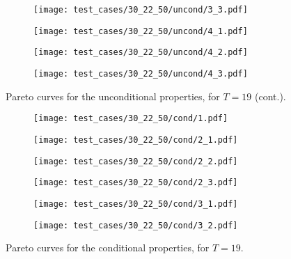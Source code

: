 \begin{figure}[H] \ContinuedFloat
\centering
\begin{subfigure}{0.49\textwidth}
  \centering
  \texttt{[image: test\_cases/30\_22\_50/uncond/3\_3.pdf]}
\end{subfigure}
\begin{subfigure}{0.49\textwidth}
  \centering
  \texttt{[image: test\_cases/30\_22\_50/uncond/4\_1.pdf]}
\end{subfigure} 
\begin{subfigure}{0.49\textwidth}
  \centering
  \texttt{[image: test\_cases/30\_22\_50/uncond/4\_2.pdf]}
\end{subfigure}
\begin{subfigure}{0.49\textwidth}
  \centering
  \texttt{[image: test\_cases/30\_22\_50/uncond/4\_3.pdf]}
\end{subfigure}
\caption{Pareto curves for the unconditional properties, for $T = 19$ (cont.).}
\label{fig:test_case_2_uncond}
\end{figure}

\begin{figure}[H]
\centering
\begin{subfigure}{0.49\textwidth}
  \centering
  \texttt{[image: test\_cases/30\_22\_50/cond/1.pdf]}
\end{subfigure}
\begin{subfigure}{0.49\textwidth}
  \centering
  \texttt{[image: test\_cases/30\_22\_50/cond/2\_1.pdf]}
\end{subfigure} 
\begin{subfigure}{0.49\textwidth}
  \centering
  \texttt{[image: test\_cases/30\_22\_50/cond/2\_2.pdf]}
\end{subfigure}
\begin{subfigure}{0.49\textwidth}
  \centering
  \texttt{[image: test\_cases/30\_22\_50/cond/2\_3.pdf]}
\end{subfigure}
\begin{subfigure}{0.49\textwidth}
  \centering
  \texttt{[image: test\_cases/30\_22\_50/cond/3\_1.pdf]}
\end{subfigure}
\begin{subfigure}{0.49\textwidth}
  \centering
  \texttt{[image: test\_cases/30\_22\_50/cond/3\_2.pdf]}
\end{subfigure}
\caption{Pareto curves for the conditional properties, for $T = 19$.}
\end{figure}

